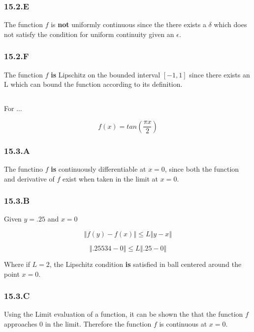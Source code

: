 \subsubsection*{15.2.E}

The function $f$ is \textbf{not} uniformly continuous since the there exists a $\delta$ which does not satisfy the condition for uniform continuity given an $\epsilon$.
\subsubsection*{15.2.F}

The function $f$ \textbf{is} Lipschitz on the bounded interval $[-1 , 1]$ since there exists an L which can bound the function according to its definition.


\subsection{}

For ...

$$
f(x) = tan\left( \frac{\pi x}{2}\right)
$$

\subsubsection*{15.3.A}
The functino $f$ \textbf{is} continuously differentiable at $x=0$, since both the function and derivative of $f$ exist when taken in the limit at $x=0$.

\subsubsection*{15.3.B}

Given $y =.25$ and $x=0$

$$
\left\Vert f(y) - f(x) \right\Vert \leq L \left\Vert y -x \right\Vert
$$

$$
\left\Vert .25534 - 0 \right\Vert \leq L \left\Vert .25 - 0 \right\Vert
$$

Where if $L =2$, the Lipschitz condition \textbf{is} satisfied in ball centered around the point $x=0$.

\subsubsection*{15.3.C}

Using the Limit evaluation of a function, it can be shown the that the function $f$ approaches $0$ in the limit. Therefore the function $f$ is continuous at $x=0$.

